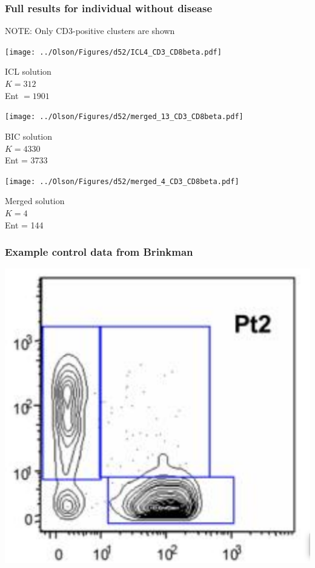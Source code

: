 \documentclass[mathserif,compress]{beamer}
\renewcommand\;{\,}
\begin{document}
\begin{frame}\frametitle{Full results for individual without disease}
\alert{NOTE}: Only CD3-positive clusters are shown
\begin{center}
\begin{minipage}{0.3\linewidth}
\texttt{[image: ../Olson/Figures/d52/ICL4\_CD3\_CD8beta.pdf]}
\begin{center}
ICL solution
\\
$K = 312$
\\
Ent $= 1901$
\end{center}
\end{minipage}
\hfill
\begin{minipage}{0.3\linewidth}
\texttt{[image: ../Olson/Figures/d52/merged\_13\_CD3\_CD8beta.pdf]}
\begin{center}
BIC solution
\\
$K = 4330$
\\
Ent = 3733
\end{center}
\end{minipage}
\hfill
\begin{minipage}{0.3\linewidth}
\texttt{[image: ../Olson/Figures/d52/merged\_4\_CD3\_CD8beta.pdf]}
\begin{center}
Merged solution
\\
$K = 4$
\\
Ent = 144
\end{center}
\end{minipage}
\end{center}
\end{frame}

\begin{frame}\frametitle{Example control data from Brinkman}

\begin{center}
\includegraphics[width=0.7\linewidth]{Brinkman.png}
\end{center}
\end{frame}
\end{document}
